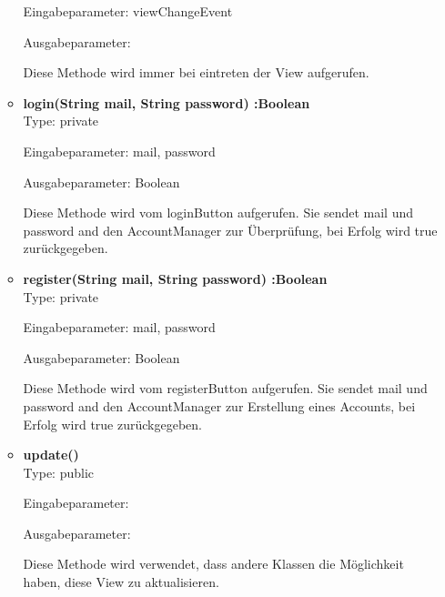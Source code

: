 \begin{itemize}
\begin{itemize}
Eingabeparameter: viewChangeEvent

Ausgabeparameter:

Diese Methode wird immer bei eintreten der View aufgerufen.



\item \textbf{login(String mail, String password) :Boolean} \hfill\\ 
Type: private

Eingabeparameter: mail, password

Ausgabeparameter: Boolean

Diese Methode wird vom loginButton aufgerufen. Sie sendet mail und password and den AccountManager zur Überprüfung, bei Erfolg wird true zurückgegeben.



\item \textbf{register(String mail, String password) :Boolean}\hfill\\
Type: private

Eingabeparameter: mail, password

Ausgabeparameter: Boolean

Diese Methode wird vom registerButton aufgerufen. Sie sendet mail und password and den AccountManager zur Erstellung eines Accounts, bei Erfolg wird true zurückgegeben.



\item \textbf{update()} \hfill\\ 
Type: public

Eingabeparameter:

Ausgabeparameter:

Diese Methode wird verwendet, dass andere Klassen die Möglichkeit haben, diese View zu aktualisieren.
\end{itemize}

\end{itemize}